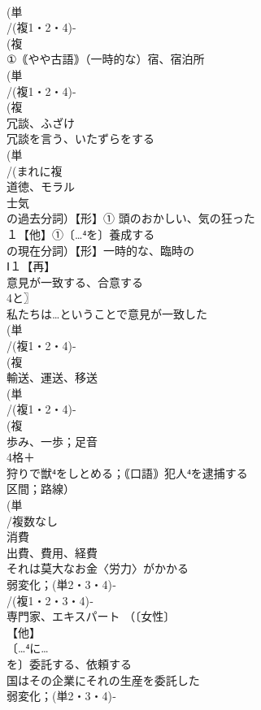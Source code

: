 \documentclass[8pt]{extreport}
\begin{document}
\begin{CJK}{UTF8}{min}
\\	(単
\\	/(複1・2・4)-
\\	(複
\\	①｟やや古語｠（一時的な）宿、宿泊所 
\\	(単
\\	/(複1・2・4)-
\\	(複
\\	冗談、ふざけ 
\\	冗談を言う、いたずらをする 
\\	(単
\\	/(まれに複
\\	道徳、モラル 
\\	士気
\\	の過去分詞）【形】① 頭のおかしい、気の狂った
\\	１【他】①〔…⁴を〕養成する 
\\	の現在分詞）【形】一時的な、臨時の 
\\	Ⅰ１【再】
\\	意見が一致する、合意する 
\\	4と〗
\\	私たちは…ということで意見が一致した
\\	(単
\\	/(複1・2・4)-
\\	(複
\\	輸送、運送、移送
\\	(単
\\	/(複1・2・4)-
\\	(複
\\	歩み、一歩；足音 
\\	4格＋
\\	狩りで獣⁴をしとめる；｟口語｠犯人⁴を逮捕する 
\\	区間；路線）
\\	(単
\\	/複数なし 
\\	消費　
\\	出費、費用、経費 
\\	それは莫大なお金〈労力〉がかかる
\\	弱変化；(単2・3・4)‐
\\	/(複1・2・3・4)‐
\\	専門家、エキスパート （〔女性〕
\\	【他】
\\	〔…⁴に…
\\	を〕委託する、依頼する 
\\	国はその企業にそれの生産を委託した
\\	弱変化；(単2・3・4)‐

\end{CJK}
\end{document}
